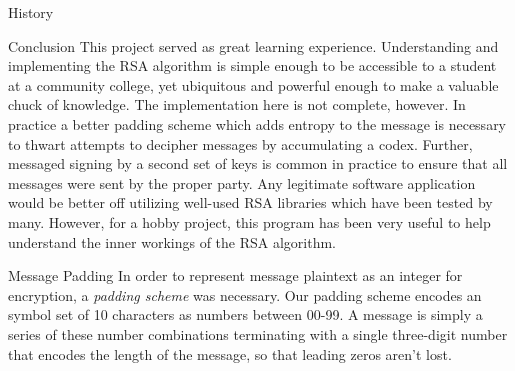\documentclass[landscape,fontscale=.4,paperwidth=48in,paperheight=36in]{baposter} %
\begin{document}
\begin{poster}
\begin{posterbox}[name=history, column=13, below=rsa,span=17]{History}
\begin{multicols}{2}
\end{multicols}
\end{posterbox}


\begin{posterbox}[name=conclusion, column=31, below=code, span=13]{Conclusion} 
This project served as great learning experience. Understanding and implementing the RSA algorithm is simple enough to be accessible to a student at a community college, yet ubiquitous and powerful enough to make a valuable chuck of knowledge. The implementation here is not complete, however. In practice a better padding scheme which adds entropy to the message is necessary to thwart attempts to decipher messages by accumulating a codex. Further, messaged signing by a second set of keys is common in practice to ensure that all messages were sent by the proper party. Any legitimate software application would be better off utilizing well-used RSA libraries which have been tested by many. However, for a hobby project, this program has been very useful to help understand the inner workings of the RSA algorithm.
\end{posterbox}



\begin{posterbox}[name=padding, column=44, below=code, span=14]{Message Padding}
In order to represent message plaintext as an integer for encryption, a \emph{padding scheme} was necessary. Our padding scheme encodes an symbol set of 10 characters as numbers between 00-99. A message is simply a series of these number combinations terminating with a single three-digit number that encodes the length of the message, so that leading zeros aren't lost.
\end{posterbox}





\end{poster}
\end{document}
